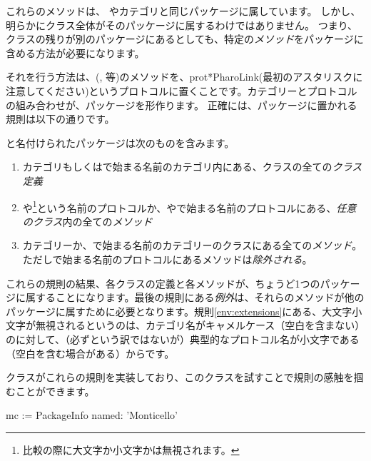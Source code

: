 \documentclass[a4paper,10pt,twoside]{book}
\begin{document}
\noindent
これらのメソッドは、
やカテゴリと同じパッケージに属しています。
しかし、明らかにクラス全体がそのパッケージに属するわけではありません。
つまり、クラスの残りが別のパッケージにあるとしても、特定の\emph{メソッド}をパッケージに含める方法が必要になります。


それを行う方法は、(,  等)のメソッドを、prot{*PharoLink}(最初のアスタリスクに注意してください)というプロトコルに置くことです。カテゴリーとプロトコルの組み合わせが、パッケージを形作ります。
正確には、パッケージに置かれる規則は以下の通りです。

と名付けられたパッケージは次のものを含みます。

\begin{enumerate} 
\item{} カテゴリもしくはで始まる名前のカテゴリ内にある、クラスの全ての\emph{クラス定義}
\item{} \label{env:extensions} や\footnote{比較の際に大文字か小文字かは無視されます。}という名前のプロトコルか、やで始まる名前のプロトコルにある、\emph{任意のクラス}内の全ての\emph{メソッド}
\item{} カテゴリーか、で始まる名前のカテゴリーのクラスにある全ての\emph{メソッド}。ただし\prot{*}で始まる名前のプロトコルにあるメソッドは\emph{除外される}。

\end{enumerate}
\noindent
これらの規則の結果、各クラスの定義と各メソッドが、ちょうど1つのパッケージに属することになります。最後の規則にある\emph{例外}は、それらのメソッドが他のパッケージに属すために必要となります。規則\ref{env:extensions}にある、大文字小文字が無視されるというのは、カテゴリ名がキャメルケース（空白を含まない）のに対して、（必ずという訳ではないが）典型的なプロトコル名が小文字である（空白を含む場合がある）からです。

クラスがこれらの規則を実装しており、このクラスを試すことで規則の感触を掴むことができます。


\begin{code}{}
mc := PackageInfo named: 'Monticello'
\end{code}
\end{document}
